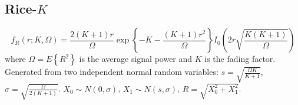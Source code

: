 \subsection{Rice-$K$}
\[
    f_R(r;K,\Omega) = 
        \frac{2(K+1)r}{\Omega}
        \exp\left\{-K-\frac{(K+1)r^2}{\Omega}\right\}
        I_0\left( 2r\sqrt{\frac{K(K+1)}{\Omega}} \right)
\]
where $\Omega=E\left\{R^2\right\}$ is the average signal power and $K$ is the
fading factor.
Generated from two independent normal random variables:
$s = \sqrt{\frac{\Omega K}{K+1}}$,
$\sigma = \sqrt{\frac{\Omega}{2(K+1)}}$.
$X_0 \sim N(0,\sigma)$,
$X_1 \sim N(s,\sigma)$,
$R = \sqrt{X_0^2 + X_1^2}$.

